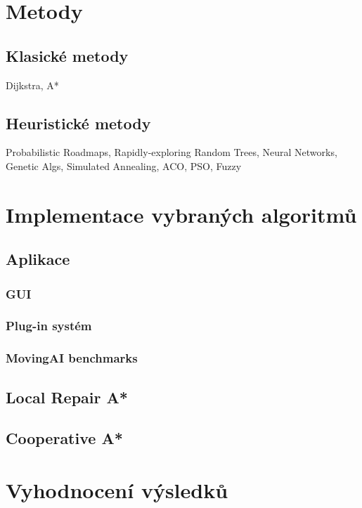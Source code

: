 \chapter{Metody}
\section{Klasické metody}
Dijkstra, A*
\section{Heuristické metody}
Probabilistic Roadmaps, Rapidly-exploring Random Trees, Neural Networks, Genetic Algs, Simulated Annealing, ACO, PSO, Fuzzy

\chapter{Implementace vybraných algoritmů}
\section{Aplikace}
\subsection{GUI}
\subsection{Plug-in systém}
\subsection{MovingAI benchmarks}

\section{Local Repair A*}
\section{Cooperative A*}

\chapter{Vyhodnocení výsledků}

\clearpage
